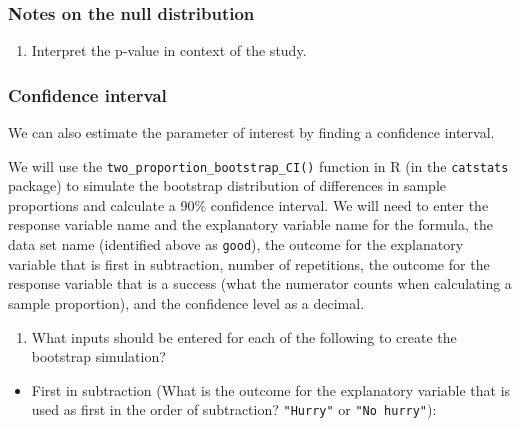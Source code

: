 \documentclass[
]{report}
\providecommand{\tightlist}{%
  \setlength{\itemsep}{0pt}\setlength{\parskip}{0pt}}
\begin{document}
\subsubsection*{Notes on the null distribution}\label{notes-on-the-null-distribution-2}

\vspace{1.6in}

\begin{enumerate}
\def\labelenumi{\arabic{enumi}.}
\setcounter{enumi}{5}
\tightlist
\item
  Interpret the p-value in context of the study.
\end{enumerate}

\vspace{1in}

\subsubsection*{Confidence interval}\label{confidence-interval-1}

We can also estimate the parameter of interest by finding a confidence interval.

We will use the \texttt{two\_proportion\_bootstrap\_CI()} function in R (in the \texttt{catstats} package) to simulate the bootstrap distribution of differences in sample proportions and calculate a 90\% confidence interval. We will need to enter the response variable name and the explanatory variable name for the formula, the data set name (identified above as \texttt{good}), the outcome for the explanatory variable that is first in subtraction, number of repetitions, the outcome for the response variable that is a success (what the numerator counts when calculating a sample proportion), and the confidence level as a decimal.

\begin{enumerate}
\def\labelenumi{\arabic{enumi}.}
\setcounter{enumi}{6}
\tightlist
\item
  What inputs should be entered for each of the following to create the bootstrap simulation?
  \vspace{1mm}
\end{enumerate}

\begin{itemize}
\tightlist
\item
  First in subtraction (What is the outcome for the explanatory variable that is used as first in the order of subtraction? \texttt{"Hurry"} or \texttt{"No\ hurry"}):
\end{itemize}
\end{document}
